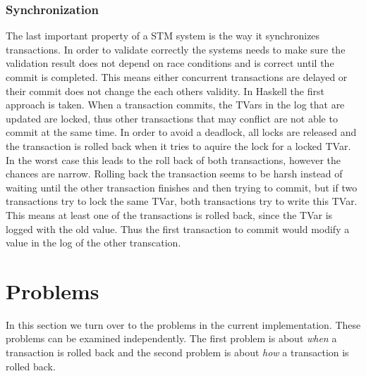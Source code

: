 \subsubsection{Synchronization} The last important property of a STM system is the way it synchronizes transactions. In order to validate
correctly the systems needs to make sure the validation result does not depend on race conditions and is correct until the commit 
is completed. This means either concurrent transactions are delayed or their commit does not change the each others validity. In Haskell the first
approach is taken. When a transaction commits, the TVars in the log that are updated are locked, thus other transactions that may conflict are not 
able to commit at the same time. In order to avoid a deadlock, all locks are released and the transaction
is rolled back when it tries to aquire the lock for a locked TVar. In the worst case this leads to the roll back of both transactions, 
however the chances are narrow. Rolling back the transaction seems to be harsh instead of waiting until the other transaction finishes 
and then trying to commit, but if two transactions try to lock the same TVar, both transactions try to write this TVar. 
This means at least one of the transactions is rolled back, since the TVar is logged with the old value. 
Thus the first transaction to commit would modify a value in the log of the other transcation.

\section{Problems}
In this section we turn over to the problems in the current implementation. These problems can be examined independently. The first problem is about
\textit{when} a transaction is rolled back and the second problem is about \textit{how} a transaction is rolled back.

